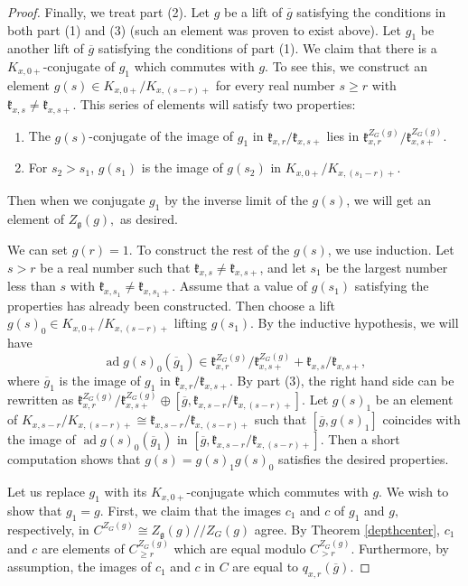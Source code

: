 \documentclass[12pt]{article}
\newcommand{\on}{\operatorname}
\theoremstyle{remark}
\begin{document}
\begin{proof}
Finally, we treat part (2). Let $g$ be a lift of $\overline{g}$ satisfying the conditions in both part (1) and (3) (such an element was proven to exist above). Let $g_1$ be another lift of $\overline{g}$ satisfying the conditions of part (1). We claim that there is a $K_{x,0+}$-conjugate of $g_1$ which commutes with $g$. To see this, we construct an element $g(s)\in K_{x,0+}/K_{x,(s-r)+}$ for every real number $s\geq r$ with $\mathfrak{k}_{x,s}\neq\mathfrak{k}_{x,s+}$. This series of elements will satisfy two properties:
\begin{enumerate}
\item The $g(s)$-conjugate of the image of $g_1$ in $\mathfrak{k}_{x,r}/\mathfrak{k}_{x,s+}$ lies in $\mathfrak{k}^{Z_G(g)}_{x,r}/\mathfrak{k}^{Z_G(g)}_{x,s+}$.
\item For $s_2>s_1$, $g(s_1)$ is the image of $g(s_2)$ in $K_{x,0+}/K_{x,(s_1-r)+}$.
 \end{enumerate}
 Then when we conjugate $g_1$ by the inverse limit of the $g(s)$, we will get an element of $Z_{\mathfrak{g}}(g),$ as desired.

We can set $g(r)=1$. To construct the rest of the $g(s)$, we use induction. Let $s>r$ be a real number such that $\mathfrak{k}_{x,s}\neq\mathfrak{k}_{x,s+}$, and let $s_1$ be the largest number less than $s$ with $\mathfrak{k}_{x,s_1}\neq\mathfrak{k}_{x,s_1+}$. Assume that a value of $g(s_1)$ satisfying the properties has already been constructed. Then choose a lift $g(s)_0\in K_{x,0+}/K_{x,(s-r)+}$ lifting $g(s_1)$. By the inductive hypothesis, we will have
\[
\on{ad} g(s)_0(\overline{g}_1)\in\mathfrak{k}^{Z_G(g)}_{x,r}/\mathfrak{k}^{Z_G(g)}_{x,s+}+\mathfrak{k}_{x,s}/\mathfrak{k}_{x,s+},
\]
where $\overline{g}_1$ is the image of $g_1$ in $\mathfrak{k}_{x,r}/\mathfrak{k}_{x,s+}$. By part (3), the right hand side can be rewritten as $\mathfrak{k}^{Z_G(g)}_{x,r}/\mathfrak{k}^{Z_G(g)}_{x,s+}\oplus[\overline{g},\mathfrak{k}_{x,s-r}/\mathfrak{k}_{x,(s-r)+}]$. Let $g(s)_1$ be an element of $K_{x,s-r}/K_{x,(s-r)+}\cong\mathfrak{k}_{x,s-r}/\mathfrak{k}_{x,(s-r)+}$ such that $[\overline{g},g(s)_1]$ coincides with the image of $\on{ad} g(s)_0(\overline{g}_1)$ in $[\overline{g},\mathfrak{k}_{x,s-r}/\mathfrak{k}_{x,(s-r)+}]$. Then a short computation shows that $g(s)=g(s)_1g(s)_0$ satisfies the desired properties.

Let us replace $g_1$ with its $K_{x,0+}$-conjugate which commutes with $g$. We wish to show that $g_1=g.$ First, we claim that the images $c_1$ and $c$ of $g_1$ and $g,$ respectively, in $C^{Z_G(g)}\cong Z_{\mathfrak{g}}(g)//Z_G(g)$ agree. By Theorem \ref{depthcenter}, $c_1$ and $c$ are elements of $C^{Z_G(g)}_{\geq r}$ which are equal modulo $C^{Z_G(g)}_{>r}.$ Furthermore, by assumption, the images of $c_1$ and $c$ in $C$ are equal to $q_{x,r}(\overline{g})$.


\end{proof}
\end{document}
